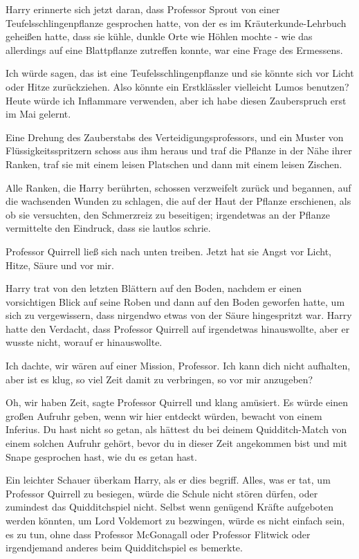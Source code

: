 Harry erinnerte sich jetzt daran, dass Professor Sprout von einer
Teufelsschlingenpflanze gesprochen hatte, von der es im Kräuterkunde-Lehrbuch
geheißen hatte, dass sie kühle, dunkle Orte wie Höhlen mochte - wie das
allerdings auf eine Blattpflanze zutreffen konnte, war eine Frage des Ermessens.

\glqq{}Ich würde sagen, das ist eine Teufelsschlingenpflanze und sie könnte sich
vor Licht oder Hitze zurückziehen. Also könnte ein Erstklässler vielleicht Lumos
benutzen? Heute würde ich Inflammare verwenden, aber ich habe diesen
Zauberspruch erst im Mai gelernt.\grqq{}

Eine Drehung des Zauberstabs des Verteidigungsprofessors, und ein Muster von
Flüssigkeitsspritzern schoss aus ihm heraus und traf die Pflanze in der Nähe
ihrer Ranken, traf sie mit einem leisen Platschen und dann mit einem leisen
Zischen.

Alle Ranken, die Harry berührten, schossen verzweifelt zurück und begannen, auf
die wachsenden Wunden zu schlagen, die auf der Haut der Pflanze erschienen, als
ob sie versuchten, den Schmerzreiz zu beseitigen; irgendetwas an der Pflanze
vermittelte den Eindruck, dass sie lautlos schrie.

Professor Quirrell ließ sich nach unten treiben. \glqq{}Jetzt hat sie Angst vor
Licht, Hitze, Säure und vor mir.\grqq{}

Harry trat von den letzten Blättern auf den Boden, nachdem er einen vorsichtigen
Blick auf seine Roben und dann auf den Boden geworfen hatte, um sich zu
vergewissern, dass nirgendwo etwas von der Säure hingespritzt war. Harry hatte
den Verdacht, dass Professor Quirrell auf irgendetwas hinauswollte, aber er
wusste nicht, worauf er hinauswollte.

\glqq{}Ich dachte, wir wären auf einer Mission, Professor. Ich kann dich nicht
aufhalten, aber ist es klug, so viel Zeit damit zu verbringen, so vor mir
anzugeben?\grqq{}

\glqq{}Oh, wir haben Zeit\grqq{}, sagte Professor Quirrell und klang amüsiert.
\glqq{}Es würde einen großen Aufruhr geben, wenn wir hier entdeckt würden,
bewacht von einem Inferius. Du hast nicht so getan, als hättest du bei deinem
Quidditch-Match von einem solchen Aufruhr gehört, bevor du in dieser Zeit
angekommen bist und mit Snape gesprochen hast, wie du es getan hast.\grqq{}

Ein leichter Schauer überkam Harry, als er dies begriff. Alles, was er tat, um
Professor Quirrell zu besiegen, würde die Schule nicht stören dürfen, oder
zumindest das Quidditchspiel nicht. Selbst wenn genügend Kräfte aufgeboten
werden könnten, um Lord Voldemort zu bezwingen, würde es nicht einfach sein, es
zu tun, ohne dass Professor McGonagall oder Professor Flitwick oder irgendjemand
anderes beim Quidditchspiel es bemerkte.

